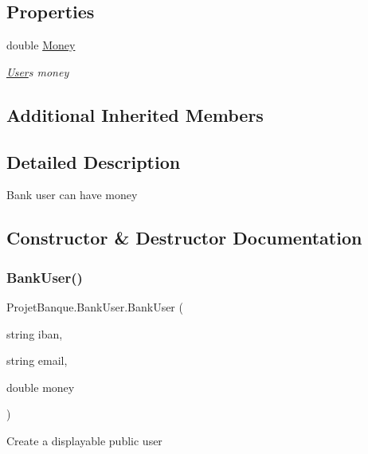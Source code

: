 \subsection*{Properties}
\begin{DoxyCompactItemize}
\item 
double \mbox{\hyperlink{class_projet_banque_1_1_bank_user_a466b0babf53339959effca55432c5f50}{Money}}
\begin{DoxyCompactList}\small\item\em \mbox{\hyperlink{class_projet_banque_1_1_user}{User}}\textquotesingle{}s money \end{DoxyCompactList}\end{DoxyCompactItemize}
\subsection*{Additional Inherited Members}


\subsection{Detailed Description}
Bank user can have money 



\subsection{Constructor \& Destructor Documentation}
\mbox{\label{class_projet_banque_1_1_bank_user_a71bbea3dd3db42f9ae11b67338d47f48}} 
\subsubsection{\texorpdfstring{BankUser()}{BankUser()}}
{\footnotesize\ttfamily Projet\+Banque.\+Bank\+User.\+Bank\+User (\begin{DoxyParamCaption}\item[{string}]{iban,  }\item[{string}]{email,  }\item[{double}]{money }\end{DoxyParamCaption})}



Create a displayable public user 


